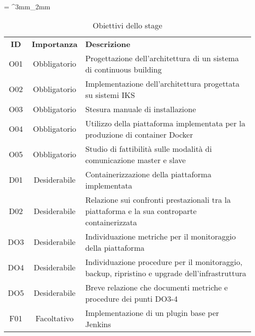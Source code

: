 \tabulinesep = ^3mm_2mm
\begin{longtabu} to \textwidth {ccX}
    \caption[Obiettivi dello stage]{Obiettivi dello stage}
    \label{tabella:obiettivi-iniziali}
    \endlastfoot
    \rowfont{\bfseries\sffamily\leavevmode\color{white}}
    \textbf{ID} & \textbf{Importanza} & \textbf{Descrizione} \\
    O01 & Obbligatorio & Progettazione dell’architettura di un sistema di \gls{continuous building} \\ %
    O02 & Obbligatorio & Implementazione dell’architettura progettata su sistemi IKS \\ %
    O03 & Obbligatorio & Stesura manuale di installazione \\ %
    O04 & Obbligatorio & Utilizzo della piattaforma implementata per la produzione di \gls{container} Docker \\ %
    O05 & Obbligatorio & Studio di fattibilità sulle modalità di comunicazione \gls{master} e \gls{slave} \\ %
    D01 & Desiderabile & Containerizzazione della piattaforma implementata \\ %
    D02 & Desiderabile & Relazione sui confronti prestazionali tra la piattaforma e la sua controparte containerizzata \\ %
    DO3 & Desiderabile & Individuazione metriche per il monitoraggio della piattaforma \\ %
    DO4 & Desiderabile &  Individuazione procedure per il monitoraggio, backup, ripristino e upgrade dell’infrastruttura \\ %
    DO5 & Desiderabile & Breve relazione che documenti metriche e procedure dei punti DO3-4 \\ %
    F01 & Facoltativo & Implementazione di un plugin base per Jenkins \\ %
\end{longtabu}
\clearpage